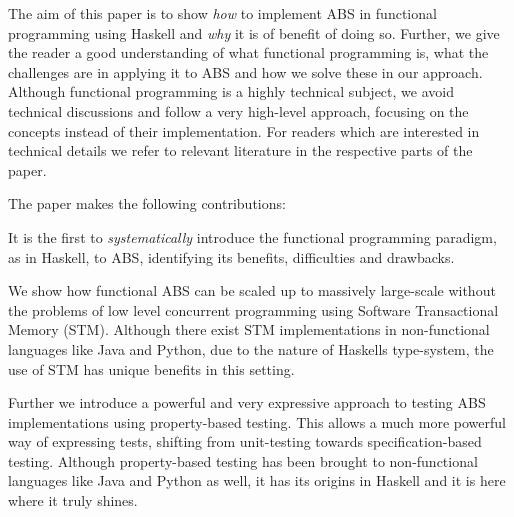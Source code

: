 The aim of this paper is to show \textit{how} to implement ABS in functional programming using Haskell and \textit{why} it is of benefit of doing so. Further, we give the reader a good understanding of what functional programming is, what the challenges are in applying it to ABS and how we solve these in our approach. Although functional programming is a highly technical subject, we avoid technical discussions and follow a very high-level approach, focusing on the concepts instead of their implementation. For readers which are interested in technical details we refer to relevant literature in the respective parts of the paper.

The paper makes the following contributions:

\begin{itemize*}
	\item It is the first to \textit{systematically} introduce the functional programming paradigm, as in Haskell, to ABS, identifying its benefits, difficulties and drawbacks. 
	\item We show how functional ABS can be scaled up to massively large-scale without the problems of low level concurrent programming using Software Transactional Memory (STM). Although there exist STM implementations in non-functional languages like Java and Python, due to the nature of Haskells type-system, the use of STM has unique benefits in this setting.
	\item Further we introduce a powerful and very expressive approach to testing ABS implementations using property-based testing. This allows a much more powerful way of expressing tests, shifting from unit-testing towards specification-based testing. Although property-based testing has been brought to non-functional languages like Java and Python as well, it has its origins in Haskell and it is here where it truly shines.
\end{itemize*}
